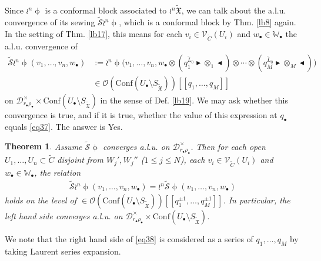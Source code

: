 \documentclass[12pt,a4paper,notitlepage]{article}
\theoremstyle{definition}
\theoremstyle{plain}
\newtheorem{thm}[df]{Theorem}
\newcommand{\fk}{\mathfrak}
\newcommand{\mc}{\mathcal}
\newcommand{\wtd}{\widetilde}
\newcommand{\Conf}{\mathrm{Conf}}
\newcommand{\scr}{\mathscr}
\newcommand{\blt}{\bullet}
\newcommand{\Wbb}{\mathbb W}
\newcommand{\btl}{\blacktriangleleft}
\newcommand{\btr}{\blacktriangleright}
\newcommand{\SXtd}{S_{\wtd{\fk X}}}
\numberwithin{equation}{section}
\begin{document}
Since $\wr^n\upphi$ is a conformal block associated to $\wr^n\wtd{\fk X}$, we can talk about the a.l.u. convergence of its sewing $\wtd{\mc S}\wr^n\upphi$, which is a conformal block by Thm. \ref{lb8} again. In the setting of Thm. \ref{lb17}, this means  for each $v_i\in\scr V_{\wtd C}(U_i)$ and $w_\blt\in\Wbb_\blt$ the a.l.u. convergence of
\begin{align}
\wtd{\mc S}\wr^n\upphi(v_1,\dots,v_n,w_\blt)&:=\wr^n\upphi\Big(v_1,\dots,v_n,w_\blt\otimes(q_1^{\wtd  L_0}\btr\otimes_1\btl)\otimes\cdots\otimes (q_M^{\wtd  L_0}\btr\otimes_M\btl)\Big)	\label{eq39}\\
&\in\scr O(\Conf(U_\blt\setminus\SXtd))[[q_1,\dots,q_M]]\nonumber
\end{align}
on $\mc D_{r_\blt\rho_\blt}^\times\times \Conf(U_\blt\setminus\SXtd)$ in the sense of Def. \ref{lb19}. We may ask whether this convergence is true, and if it is true, whether the value of this expression at $q_\blt$ equals \eqref{eq37}. The answer is Yes.

\begin{thm}\label{lb21}
Assume $\wtd{\mc S}\upphi$ converges a.l.u. on $\mc D_{r_\blt\rho_\blt}^\times$. Then for each open $U_1,\dots,U_n\subset \wtd C$ disjoint from $W_j',W_j''$ ($1\leq j\leq N$), each $v_i\in\scr V_{\wtd C}(U_i)$ and $w_\blt\in\Wbb_\blt$, the relation
\begin{align}
\wtd{\mc S}\wr^n\upphi(v_1,\dots,v_n,w_\blt)=	\wr^n\wtd{\mc S}\upphi(v_1,\dots,v_n,w_\blt)\label{eq38}
\end{align}
holds on the level of $\in\scr O(\Conf(U_\blt\setminus\SXtd))[[q_1^{\pm 1},\dots,q_M^{\pm 1}]]$. In particular, the left hand side converges a.l.u. on $\mc D_{r_\blt\rho_\blt}^\times\times\Conf(U_\blt\setminus\SXtd)$.
\end{thm}
We note that the right hand side of \eqref{eq38} is considered as a series of $q_1,\dots,q_M$ by taking Laurent series expansion.
\end{document}
